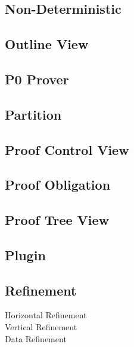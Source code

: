 \subsection{Non-Deterministic}
\label{non_deterministic}

\subsection{Outline View}
\label{outline_view}

\subsection{P0 Prover}
\label{p0_prover}

\subsection{Partition}
\label{partition}

\subsection{Proof Control View}
\label{proof_control_view}

\subsection{Proof Obligation}
\label{proof_obligation}

\subsection{Proof Tree View}
\label{proof_tree_view}

\subsection{Plugin}
\label{plugin}

\subsection{Refinement}
\label{refinement}

\begin{description}
	\item[Horizontal Refinement]
	\item[Vertical Refinement]
	\item[Data Refinement]
\end{description}

